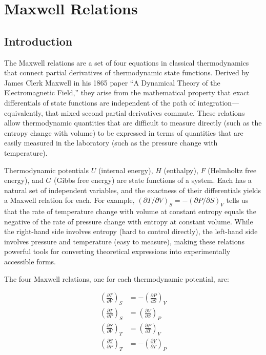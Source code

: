 \chapter{Maxwell Relations}

\section*{Introduction}

The Maxwell relations are a set of four equations in classical thermodynamics that connect partial derivatives of thermodynamic state functions. Derived by James Clerk Maxwell in his 1865 paper ``A Dynamical Theory of the Electromagnetic Field,'' they arise from the mathematical property that exact differentials of state functions are independent of the path of integration---equivalently, that mixed second partial derivatives commute. These relations allow thermodynamic quantities that are difficult to measure directly (such as the entropy change with volume) to be expressed in terms of quantities that are easily measured in the laboratory (such as the pressure change with temperature).

Thermodynamic potentials $U$ (internal energy), $H$ (enthalpy), $F$ (Helmholtz free energy), and $G$ (Gibbs free energy) are state functions of a system. Each has a natural set of independent variables, and the exactness of their differentials yields a Maxwell relation for each. For example, $(\partial T/\partial V)_{S} = -(\partial P/\partial S)_{V}$ tells us that the rate of temperature change with volume at constant entropy equals the negative of the rate of pressure change with entropy at constant volume. While the right-hand side involves entropy (hard to control directly), the left-hand side involves pressure and temperature (easy to measure), making these relations powerful tools for converting theoretical expressions into experimentally accessible forms.


The four Maxwell relations, one for each thermodynamic potential, are:

\begin{align}
\left(\frac{\partial T}{\partial V}\right)_{S} &= -\left(\frac{\partial P}{\partial S}\right)_{V}
\label{eq:maxwell1} \\
\left(\frac{\partial T}{\partial P}\right)_{S} &= \left(\frac{\partial V}{\partial S}\right)_{P}
\label{eq:maxwell2} \\
\left(\frac{\partial S}{\partial V}\right)_{T} &= \left(\frac{\partial P}{\partial T}\right)_{V}
\label{eq:maxwell3} \\
\left(\frac{\partial S}{\partial P}\right)_{T} &= -\left(\frac{\partial V}{\partial T}\right)_{P}
\label{eq:maxwell4}
\end{align}

